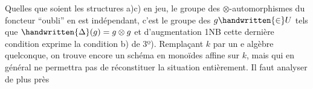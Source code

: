  Quelles que soient les structures a)c) en jeu, le groupe des $\otimes$-automorphismes du foncteur  ``oubli'' en est indépendant, c'est le groupe des $g\handwritten{\in}U$ tels que $\handwritten{\Delta}(g)=g\otimes g$ et d'augmentation 1\unsure{(}NB cette dernière condition exprime la condition b) de 3º). Remplaçant $k$ par un e algèbre quelconque, on trouve encore un  schéma en monoïdes affine sur $k$, mais qui en général ne permettra pas de réconstituer la situation entièrement.  Il faut analyser de plus près
